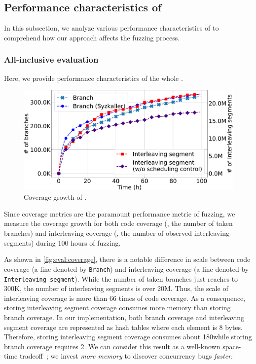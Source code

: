 \subsection{Performance characteristics of \sys}
\label{ss:characteristics}

In this subsection, we analyze various performance characteristics of
\sys to comprehend how our approach affects the fuzzing process.
%
\subsubsection{All-inclusive evaluation}
\label{sss:allinclusive}

Here, we provide performance characteristics of the whole \sys.


%
\begin{figure}[t]
  \centering
  \includegraphics[width=0.9\linewidth]{fig/coverage_graph-crop.pdf}
  \caption{Coverage growth of \sys.}
  \label{fig:eval:coverage}
  \vspace{-5pt}
\end{figure}
%
Since coverage metrics are the paramount performance metric of
fuzzing, we measure the coverage growth for both code coverage (\ie,
the number of taken branches) and interleaving coverage (\ie, the
number of observed interleaving segments) during 100 hours of fuzzing.

As shown in \autoref{fig:eval:coverage}, there is a notable difference
in scale between code coverage (a line denoted by \texttt{Branch}) and
interleaving coverage (a line denoted by \texttt{Interleaving segment}).
%
While the number of taken branches just reaches to 300K, the number of
interleaving segments is over 20M. Thus, the scale of interleaving
coverage is more than 66 times of code coverage.
%
As a consequence, storing interleaving segment coverage consumes more
memory than storing branch coverage.
%
In our implementation, both branch coverage and interleaving segment
coverage are represented as hash tables where each element is 8
bytes. Therefore, storing interleaving segment coverage consumes about
180\MB while storing branch coverage requires 2\MB.
%
We can consider this result as a well-known space-time
tradeoff~\cite{spacetimetradeoff}; we invest \textit{more memory} to
discover concurrency bugs \textit{faster}.
%


